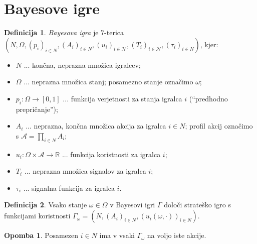 \documentclass[11pt]{article}
\newcommand{\R}{\mathbb{R}}
\newcommand{\N}{\mathbb{N}}
\newcommand{\A}{\mathscr{A}}
\newcommand{\oklepaj}[1]{\left(#1\right)}
\newcommand{\1}{\mathbbm{1}}
\renewcommand{\N}{\mathcal{N}}
\theoremstyle{definition}
\newtheorem{definicija}{Definicija}[section]
\theoremstyle{definition}
\theoremstyle{definition}
\theoremstyle{definition}
\newtheorem*{opomba}{Opomba}
\begin{document}
\pagebreak


\section{Bayesove igre}
\vspace{0.5cm}

\begin{definicija}

\textit{Bayesova igra} je $7$-terica $\oklepaj{N, \Omega, (p_i)_{i \in N}, (A_i)_{i \in N}, (u_i)_{i \in \N}, (T_i)_{i \in \N}, (\tau_i)_{i \in N}}$, kjer:
\begin{itemize}
	\item $N$ ... končna, neprazna množica igralcev;
	\item $\Omega$ ... neprazna množica stanj; posamezno stanje označimo $\omega$;
	\item $p_i: \Omega \rightarrow [0,1]$ ... funkcija verjetnosti za stanja igralca $i$ (``predhodno prepričanje'');
	\item $A_i$ ... neprazna, končna množica akcija za igralca $i \in N$; profil akcij označimo s $\A = \prod_{i \in N} A_i$;
	\item $u_i: \Omega \times \A \rightarrow \R$ ... funkcija koristnosti za igralca $i$;
	\item $T_i$ ... neprazna množica signalov za igralca $i$;
	\item $\tau_i$ ... signalna funkcija za igralca $i$.
\end{itemize}

\end{definicija}
\vspace{0.5cm}

\begin{definicija}

Vsako stanje $\omega \in \Omega$ v Bayesovi igri $\Gamma$ določi strateško igro s funkcijami koristnosti $\Gamma_\omega = \oklepaj{N, (A_i)_{i \in N}, (u_i(\omega,\cdot))_{i \in N}}$.

\end{definicija}
\vspace{0.5cm}

\begin{opomba}

Posamezen $i \in N$ ima v vsaki $\Gamma_\omega$ na voljo iste akcije.

\end{opomba}
\vspace{0.5cm}
\end{document}
